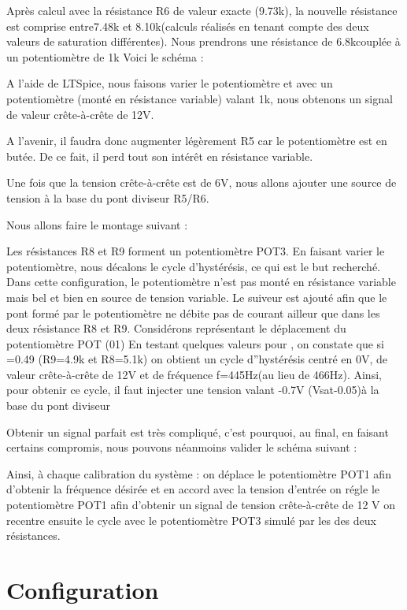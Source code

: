 {Après calcul avec la résistance R6 de valeur exacte (9.73k), la nouvelle résistance est  comprise entre7.48k et 8.10k(calculs réalisés en tenant compte des deux valeurs de saturation différentes).
Nous prendrons une résistance de 6.8kcouplée à un potentiomètre de 1k
Voici le schéma :


A l’aide de LTSpice, nous faisons varier le potentiomètre et avec un potentiomètre (monté en résistance variable) valant 1k, nous obtenons un signal de valeur crête-à-crête de 12V.


A l’avenir, il faudra donc augmenter légèrement R5 car le potentiomètre est en butée. De ce fait, il perd tout son intérêt en résistance variable.

Une fois que la tension crête-à-crête est de 6V, nous allons ajouter une source de tension à la base du pont diviseur R5/R6.






Nous allons faire le montage suivant : 



Les résistances R8 et R9 forment un potentiomètre POT3. En faisant varier le potentiomètre, nous décalons le cycle d'hystérésis, ce qui est le but recherché.
Dans cette configuration, le potentiomètre n’est pas monté en résistance variable mais bel et bien en source de tension variable. Le suiveur est ajouté afin que le pont formé par le potentiomètre ne débite pas de courant ailleur que dans les deux résistance R8 et R9.
Considérons représentant le déplacement du potentiomètre POT (01)
En testant quelques valeurs pour , on constate que si =0.49 (R9=4.9k et R8=5.1k)
on obtient un cycle d”hystérésis centré en 0V, de valeur crête-à-crête de 12V et de fréquence f=445Hz(au lieu de 466Hz).
Ainsi, pour obtenir ce cycle, il faut injecter une tension valant -0.7V (Vsat-0.05)à la base du pont diviseur

Obtenir un signal parfait est très compliqué, c’est pourquoi, au final, en faisant certains compromis, nous pouvons néanmoins valider le schéma suivant :





Ainsi, à chaque calibration du système : 
on déplace le potentiomètre POT1 afin d’obtenir la fréquence désirée et en accord avec la tension d’entrée
on régle le potentiomètre POT1 afin d’obtenir un signal de tension crête-à-crête de 12 V
on recentre ensuite le cycle avec le potentiomètre POT3 simulé par les des deux résistances.\chapter{Configuration}

}

